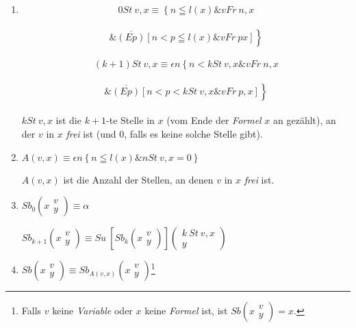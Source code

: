 \documentclass[draft]{scrartcl}
\begin{document}
\begin{enumerate}[1.]
	\item {}$$
		0 St\ v, x \equiv \left\{ n \leqq l\left(x\right) \& v Fr\ n, x \right.
	$$\\[\spacebetweenbreakedequations]
	$$\left.\& \overline{\left(Ep\right)} \left[n < p \leqq l\left(x\right) \& v Fr\ p x\right]\right\}
	$$\\[\spaceafterbreakedequation]

	$$
	\left(k + 1\right) St\ v, x \equiv \epsilon n \left\{n < k St\ v, x \& v Fr\ n, x \right.
	$$\\[\spacebetweenbreakedequations]
	$$
		\left.\& \overline{\left(Ep\right)} \left[n < p < k St\ v, x \& v Fr\ p, x\right]\right\}
	$$\\[\spaceafterbreakedequation]

	$k St\ v, x$ ist die $k + 1$-te Stelle in $x$ (vom Ende der \textit{Formel} $x$ an gezählt), an der $v$ in $x$ \textit{frei} ist (und 0, falls es keine solche Stelle gibt).

	\item $A\left(v, x\right) \equiv \epsilon n\left\{ n \leqq l\left(x\right) \& n St\ v, x = 0\right\}$%

	$A\left(v, x\right)$ ist die Anzahl der Stellen, an denen $v$ in $x$ \textit{frei} ist.

	\item $Sb_0 \left(x\substack{v\\y }\right) \equiv \alpha$%

	$Sb_{k + 1} \left(x\substack{v\\y}\right) \equiv Su\ \left[Sb_k\left(x\substack{v\\y}\right)\right] \left(\substack{k\ St\ v, x\\y}\right)$%
	
	\item $Sb\left(x\substack{v\\y}\right) \equiv Sb_{A\left(v, x\right)}\left(x\substack{v\\y}\right)$\footnote{Falls $v$ keine \textit{Variable} oder $x$ keine \textit{Formel} ist, ist $Sb\left(x\substack{v\\y}\right) = x$.}


\end{enumerate}
\end{document}
